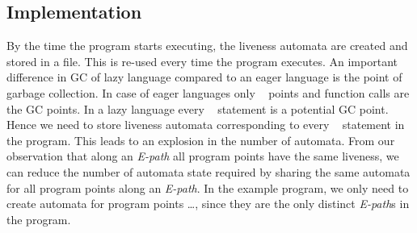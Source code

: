 \documentclass[9pt]{sigplanconf}
\newcommand{\comment}[1]{{\color{Myblue}{(#1)}}}
\begin{document}
\begin{enumerate}
\section{Implementation}
By the  time the program  starts executing, the liveness  automata are
created and stored in a file.   This is re-used every time the program
executes.  An important difference in  GC of lazy language compared to
an  eager language is  the point  of garbage  collection.  In  case of
eager  languages only  \CONS~ points  and  function calls  are the  GC
points. In  a lazy  language every \LET~  statement is a  potential GC
point. Hence we need to store liveness automata corresponding to every
\LET~  statement in the  program. This  leads to  an explosion  in the
number of  automata. \comment{Directly say that we share the automata}From our  observation that along an  {\em E-path}
all program points have the same liveness, we can reduce the number of
automata state required  by sharing the same automata  for all program
points along an {\em E-path}. In  the example program, we only need to
create automata  for program  points \ldots, since  they are  the only
distinct {\em E-path}s in the program.



\end{enumerate}
\end{document}
